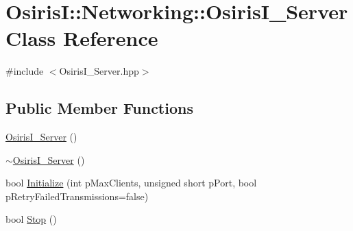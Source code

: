\hypertarget{class_osiris_i_1_1_networking_1_1_osiris_i___server}{\section{Osiris\-I\-:\-:Networking\-:\-:Osiris\-I\-\_\-\-Server Class Reference}
\label{class_osiris_i_1_1_networking_1_1_osiris_i___server}
}


{\ttfamily \#include $<$Osiris\-I\-\_\-\-Server.\-hpp$>$}

\subsection*{Public Member Functions}
\begin{DoxyCompactItemize}
\item 
\hyperlink{class_osiris_i_1_1_networking_1_1_osiris_i___server_a6a47873b8c10032b25ac02fe9ad38c5a}{Osiris\-I\-\_\-\-Server} ()
\item 
\hyperlink{class_osiris_i_1_1_networking_1_1_osiris_i___server_a8fa2a614857fb560336b05ae21432ed4}{$\sim$\-Osiris\-I\-\_\-\-Server} ()
\item 
bool \hyperlink{class_osiris_i_1_1_networking_1_1_osiris_i___server_a52aa1991730bf0047d3ee1d174421b6c}{Initialize} (int p\-Max\-Clients, unsigned short p\-Port, bool p\-Retry\-Failed\-Transmissions=false)
\item 
bool \hyperlink{class_osiris_i_1_1_networking_1_1_osiris_i___server_a39f3976585526c844bc2ef14cd07a637}{Stop} ()
\end{DoxyCompactItemize}


